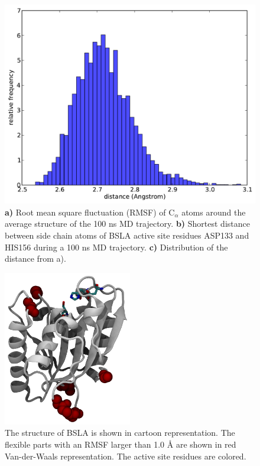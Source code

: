 \documentclass[english, a4paper, 12pt, titlepage, draft]{article}
\begin{document}
\begin{figure}
\begin{minipage}[]{0.45\linewidth}
        \includegraphics[width=\textwidth]{figures/BSLA_solo/BSLA_distribution_ASP133_HIS156.pdf}  
    \end{minipage}
    \caption{
    \textbf{a)} Root mean square fluctuation (RMSF) of C$_\alpha$ atoms around the average structure of the 100 ns MD trajectory.
    \textbf{b)} Shortest distance between side chain atoms of BSLA active site residues ASP133 and HIS156 during a 100 ns MD trajectory. 
    \textbf{c)} Distribution of the distance from a).}
\label{fig:BSLA_solo}
\end{figure} 


\begin{figure}
    \centering
    \includegraphics[width=0.5\textwidth]{figures/BSLA_flexibility.png}
    \caption{The structure of BSLA is shown in cartoon representation. The flexible parts with an RMSF larger than 1.0 \r{A} are shown in red Van-der-Waals representation. The active site residues are colored.}
    \label{fig:BSLA_flexibility}
\end{figure}       
 
\end{document}
